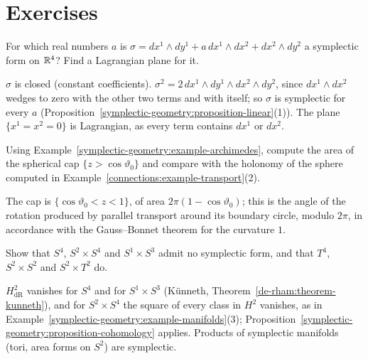 \section{Exercises}\label{symplectic-geometry:section-exercises}

\begin{exercise}\label{symplectic-geometry:exercise-nondegenerate-r4}
For which real numbers $a$ is $\sigma = dx^1 \wedge dy^1 + a\,dx^1 \wedge dx^2 + dx^2 \wedge dy^2$ a symplectic form on $\mathbb{R}^4$? Find a Lagrangian plane for it.
\end{exercise}

\begin{solution}
$\sigma$ is closed (constant coefficients). $\sigma^2 = 2\,dx^1 \wedge dy^1 \wedge dx^2 \wedge dy^2$, since $dx^1 \wedge dx^2$ wedges to zero with the other two terms and with itself; so $\sigma$ is symplectic for
every $a$ (Proposition~\ref{symplectic-geometry:proposition-linear}(1)). The plane $\{x^1 = x^2 = 0\}$ is Lagrangian, as every term contains $dx^1$ or $dx^2$.
\end{solution}

\begin{exercise}\label{symplectic-geometry:exercise-archimedes-cap}
Using Example~\ref{symplectic-geometry:example-archimedes}, compute the area of the spherical cap $\{z > \cos\vartheta_0\}$ and compare with the holonomy of the sphere computed in
Example~\ref{connections:example-transport}(2).
\end{exercise}

\begin{solution}
The cap is $\{\cos\vartheta_0 < z < 1\}$, of area $2\pi(1 - \cos\vartheta_0)$; this is the angle of the rotation produced by parallel transport around its boundary circle, modulo $2\pi$, in accordance with the
Gauss--Bonnet theorem for the curvature $1$.
\end{solution}

\begin{exercise}\label{symplectic-geometry:exercise-not-symplectic}
Show that $S^4$, $S^2 \times S^4$ and $S^1 \times S^3$ admit no symplectic form, and that $T^4$, $S^2 \times S^2$ and $S^2 \times T^2$ do.
\end{exercise}

\begin{solution}
$H^2_{\mathrm{dR}}$ vanishes for $S^4$ and for $S^1 \times S^3$ (K\"unneth, Theorem~\ref{de-rham:theorem-kunneth}), and for $S^2 \times S^4$ the square of every class in $H^2$ vanishes, as in
Example~\ref{symplectic-geometry:example-manifolds}(3); Proposition~\ref{symplectic-geometry:proposition-cohomology} applies. Products of symplectic manifolds (tori, area forms on $S^2$) are symplectic.
\end{solution}

